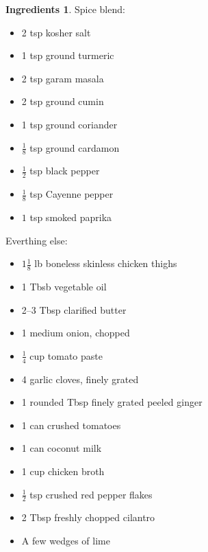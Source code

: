 \documentclass[a4paper,12pt]{scrreprt}
\theoremstyle{definition}
\newtheorem*{ingredients}{Ingredients}
\theoremstyle{plain}
\theoremstyle{remark}
\begin{document}
\begin{ingredients}

  \leavevmode
  Spice blend:
  \begin{multicols}{2}
    \begin{itemize}
      \item 2 tsp kosher salt

      \item 1 tsp ground turmeric

      \item 2 tsp garam masala

      \item 2 tsp ground cumin

      \item 1 tsp ground coriander

      \item $\tfrac{1}{8}$ tsp ground cardamon

      \item $\tfrac{1}{2}$ tsp black pepper

      \item $\tfrac{1}{8}$ tsp Cayenne pepper

      \item $1$ tsp smoked paprika
    \end{itemize}
  \end{multicols}
  Everthing else:
  \begin{multicols}{2}
    \begin{itemize}
      \item $1\tfrac{1}{8}$ lb boneless skinless chicken thighs

      \item 1 Tbsb vegetable oil

      \item 2--3 Tbsp clarified butter

      \item 1 medium onion, chopped

      \item $\frac{1}{4}$ cup tomato paste

      \item 4 garlic cloves, finely grated

      \item 1 rounded Tbsp finely grated peeled ginger

      \item 1 can crushed tomatoes

      \item 1 can coconut milk

      \item 1 cup chicken broth

      \item $\frac{1}{2}$ tsp crushed red pepper flakes

      \item 2 Tbsp freshly chopped cilantro

      \item A few wedges of lime
    \end{itemize}
  \end{multicols}
\end{ingredients}
\end{document}
